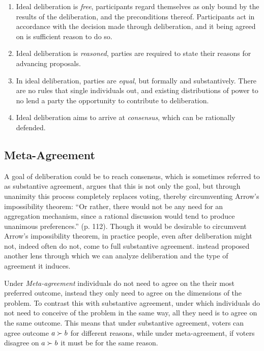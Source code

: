 \begin{enumerate}
	\label{list:ideal-deliberation}
	\setlength\itemsep{1px}
	\item  Ideal deliberation is \textit{free}, participants regard themselves as only bound by the results of the deliberation, and the preconditions thereof. Participants act in accordance with the decision made through deliberation, and it being agreed on is sufficient reason to do so.
	\item  Ideal deliberation is \textit{reasoned}, parties are required to state their reasons for advancing proposals.
	\item  In ideal deliberation, parties are \textit{equal}, but formally and substantively. There are no rules that single individuals out, and existing distributions of power to no lend a party the opportunity to contribute to deliberation.
	\item  Ideal deliberation aims to arrive at \textit{consensus}, which can be rationally defended.
\end{enumerate}

\subsection{Meta-Agreement}

A goal of deliberation could be to reach consensus, which is sometimes referred to as substantive agreement, \citet{elsterMARKETFORUMThree2002} argues that this is not only the goal, but through unanimity this process completely replaces voting, thereby circumventing Arrow's impossibility theorem: ``Or rather, there would not be any need for an aggregation mechanism, since a rational discussion would tend to produce unanimous preferences.” (p. 112). Though it would be desirable to circumvent Arrow's impossibility theorem, in practice people, even after deliberation might not, indeed often do not, come to full substantive agreement. \citet{listTwoConceptsAgreement2002} instead proposed another lens through which we can analyze deliberation and the type of agreement it induces.

Under \emph{Meta-agreement} individuals do not need to agree on the their most preferred outcome, instead they only need to agree on the dimensions of the problem. To contrast this with substantive agreement, under which individuals do not need to conceive of the problem in the same way, all they need is to agree on the same outcome. This means that under substantive agreement, voters can agree outcome $a \succ b$ for different reasons, while under meta-agreement, if voters disagree on $a \succ b$ it must be for the same reason.

